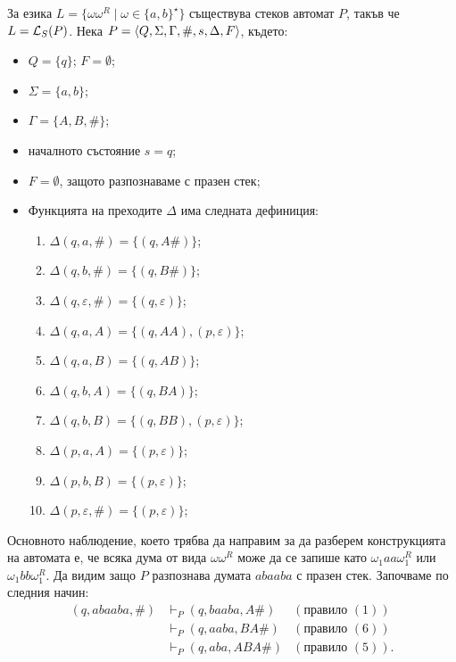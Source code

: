 \begin{example}
  \label{ex:omega-omega-r}
  За езика $L = \{\omega\omega^R \mid \omega \in \{a,b\}^\star\}$ съществува стеков автомат $P$, такъв че
  $L = \mathcal{L}_S(P)$.
  Нека $P = \langle{Q,\Sigma,\Gamma,\#,s,\Delta,F}\rangle$, където:
  \begin{itemize}
  \item 
    $Q = \{q\}$; $F = \emptyset$;
  \item
    $\Sigma = \{a,b\}$;
  \item
    $\Gamma = \{A, B, \#\}$;
  \item
    началното състояние $s = q$;
  \item
    $F = \emptyset$, защото разпознаваме с празен стек;
  \item
    Функцията на преходите $\Delta$ има следната дефиниция:
    \begin{enumerate}[(1)]
    \item 
      $\Delta(q, a, \#) = \{(q, A\#)\}$;
    \item 
      $\Delta(q, b, \#) = \{(q, B\#)\}$;
    \item
      $\Delta(q, \varepsilon, \#) = \{(q,\varepsilon)\}$;
    \item
      $\Delta(q, a, A) = \{(q, AA), (p, \varepsilon)\}$;
    \item
      $\Delta(q, a, B) = \{(q, AB)\}$;
    \item
      $\Delta(q, b, A) = \{(q, BA)\}$;
    \item
      $\Delta(q, b, B) = \{(q, BB), (p, \varepsilon)\}$;
    \item
      $\Delta(p, a, A) = \{(p,\varepsilon)\}$;
    \item
      $\Delta(p, b, B) = \{(p,\varepsilon)\}$;
    \item
      $\Delta(p, \varepsilon, \#) = \{(p,\varepsilon)\}$;
    \end{enumerate}
  \end{itemize}
  Основното наблюдение, което трябва да направим за да разберем конструкцията на автомата е, че
  всяка дума от вида $\omega\omega^R$ може да се запише като $\omega_1aa\omega^R_1$ или $\omega_1bb\omega^R_1$.
  Да видим защо $P$ разпознава думата $abaaba$ с празен стек.
  Започваме по следния начин:
  \begin{align*}
    (q,abaaba,\#) & \vdash_P (q,baaba,A\#) & (\text{правило }(1))\\
    & \vdash_P (q, aaba, BA\#) & (\text{правило }(6))\\
    & \vdash_P (q, aba, ABA\#) & (\text{правило }(5)).

\end{align*}
\end{example}
